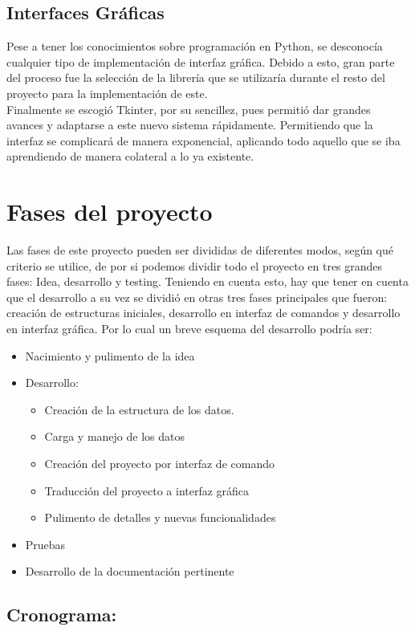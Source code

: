 \subsection{Interfaces Gráficas}
Pese a tener los conocimientos sobre programación en Python, se desconocía cualquier tipo de implementación de interfaz gráfica. Debido a esto, gran parte del proceso fue la selección de la librería que se utilizaría durante el resto del proyecto para la implementación de este.\\
Finalmente se escogió Tkinter, por su sencillez, pues permitió dar grandes avances y adaptarse a este nuevo sistema rápidamente. Permitiendo que la interfaz se complicará de manera exponencial, aplicando todo aquello que se iba aprendiendo de manera colateral a lo ya existente.
\section{Fases del proyecto}
Las fases de este proyecto pueden ser divididas de diferentes modos, según qué criterio se utilice, de por si podemos dividir todo el proyecto en tres grandes fases: Idea, desarrollo y testing. Teniendo en cuenta esto, hay que tener en cuenta que el desarrollo a su vez se dividió en otras tres fases principales que fueron: creación de estructuras iniciales, desarrollo en interfaz de comandos y desarrollo en interfaz gráfica. 
Por lo cual un breve esquema del desarrollo podría ser:
\begin{itemize}
\item Nacimiento y pulimento de la idea
\item Desarrollo:
\begin{itemize}
\item Creación de la estructura de los datos.
\item Carga y manejo de los datos
\item Creación del proyecto por interfaz de comando
\item Traducción del proyecto a interfaz gráfica
\item Pulimento de detalles y nuevas funcionalidades
\end{itemize}
\item Pruebas
\item Desarrollo de la documentación pertinente
\end{itemize}
\subsection{Cronograma: }
